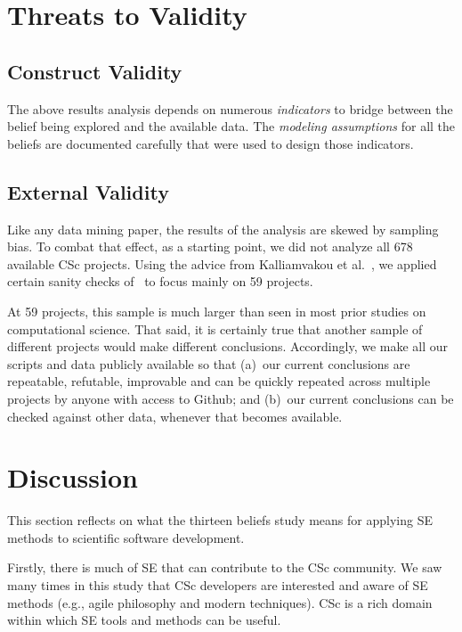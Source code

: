 \documentclass[conference,10pt]{IEEEtran}
\begin{document}
\section{Threats to Validity}

\subsection{Construct Validity}

The above results analysis depends on numerous {\em indicators} to bridge between the belief being explored and the available data. 
The {\em modeling assumptions} for all the beliefs are documented carefully that were used to design those indicators.

\subsection{External Validity}

Like any data mining paper,
the results of the analysis are skewed by sampling bias.
To combat that effect, 
as a starting point, we did not analyze all 678 available CSc projects. 
Using the advice from Kalliamvakou et al.~\cite{Kalliamvakou:2014, tu2019better}, we applied certain sanity checks of~  to focus mainly on 59  projects.

At 59 projects, this sample is much larger than seen in
most prior studies on computational
science. That said, it is certainly true that another sample of different projects would make different conclusions.
Accordingly, we make all our scripts and data publicly available so that
(a)~our current conclusions
are repeatable, refutable, improvable and can be quickly repeated across multiple projects by anyone with access to Github; and (b)~our current conclusions can be checked against other data, whenever that becomes available.


\section{Discussion}
This section reflects on what the thirteen beliefs study means for applying SE methods to scientific software development.

Firstly, there is much of SE that can contribute to the CSc community. We saw many times in this study that CSc developers are interested and aware of SE methods (e.g., agile philosophy and modern techniques). CSc is a rich domain within which SE tools and methods can be useful.
\end{document}
